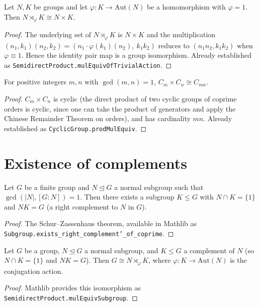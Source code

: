 \begin{lemma}
    \label{lem:sdp-trivial-action}
    Let $N, K$ be groups and let $\varphi : K \to \mathrm{Aut}(N)$ be a
    homomorphism with $\varphi = 1$. Then $N \rtimes_\varphi K \cong N \times K$.
\end{lemma}
\begin{proof}
    The underlying set of $N \rtimes_\varphi K$ is $N \times K$ and the
    multiplication
    $(n_1, k_1)(n_2, k_2) = (n_1 \cdot \varphi(k_1)(n_2),\ k_1 k_2)$
    reduces to $(n_1 n_2, k_1 k_2)$ when $\varphi \equiv 1$. Hence the
    identity pair map is a group isomorphism. Already established as
    \texttt{SemidirectProduct.mulEquivOfTrivialAction}.
\end{proof}

\begin{lemma}
    \label{lem:cyclic-prod}
    For positive integers $m, n$ with $\gcd(m, n) = 1$,
    $C_m \times C_n \cong C_{mn}$.
\end{lemma}
\begin{proof}
    $C_m \times C_n$ is cyclic (the direct product of two cyclic groups of
    coprime orders is cyclic, since one can take the product of generators
    and apply the Chinese Remainder Theorem on orders), and has cardinality
    $mn$. Already established as \texttt{CyclicGroup.prodMulEquiv}.
\end{proof}

\section{Existence of complements}

\begin{lemma}
    \label{lem:schur-zassenhaus}
    Let $G$ be a finite group and $N \trianglelefteq G$ a normal subgroup
    such that $\gcd(|N|, [G : N]) = 1$. Then there exists a subgroup
    $K \leq G$ with $N \cap K = \{1\}$ and $N K = G$ (a right complement to
    $N$ in $G$).
\end{lemma}
\begin{proof}
    The Schur--Zassenhaus theorem, available in Mathlib as
    \texttt{Subgroup.exists\_right\_complement'\_of\_coprime}.
\end{proof}

\begin{lemma}
    \label{lem:sdp-from-complement}
    Let $G$ be a group, $N \trianglelefteq G$ a normal subgroup, and
    $K \leq G$ a complement of $N$ (so $N \cap K = \{1\}$ and $NK = G$).
    Then $G \cong N \rtimes_\varphi K$, where
    $\varphi : K \to \mathrm{Aut}(N)$ is the conjugation action.
\end{lemma}
\begin{proof}
    Mathlib provides this isomorphism as
    \texttt{SemidirectProduct.mulEquivSubgroup}.
\end{proof}

